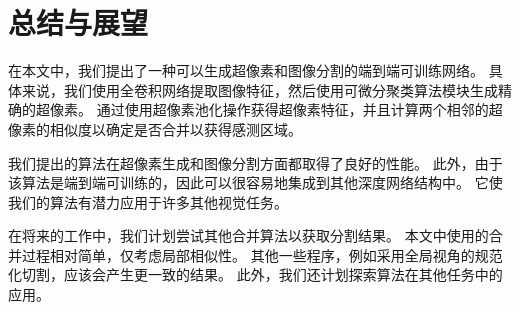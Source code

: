 
\chapter{总结与展望}

在本文中，我们提出了一种可以生成超像素和图像分割的端到端可训练网络。 具体来说，我们使用全卷积网络提取图像特征，然后使用可微分聚类算法模块生成精确的超像素。 通过使用超像素池化操作获得超像素特征，并且计算两个相邻的超像素的相似度以确定是否合并以获得感测区域。

我们提出的算法在超像素生成和图像分割方面都取得了良好的性能。 此外，由于该算法是端到端可训练的，因此可以很容易地集成到其他深度网络结构中。 它使我们的算法有潜力应用于许多其他视觉任务。

在将来的工作中，我们计划尝试其他合并算法以获取分割结果。 本文中使用的合并过程相对简单，仅考虑局部相似性。 其他一些程序，例如采用全局视角的规范化切割，应该会产生更一致的结果。 此外，我们还计划探索算法在其他任务中的应用。

